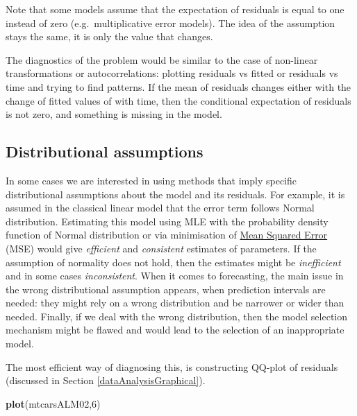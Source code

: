 \documentclass[
]{book}
\newenvironment{Shaded}{\begin{snugshade}}{\end{snugshade}}
\newcommand{\DecValTok}[1]{\textcolor[rgb]{0.00,0.00,0.81}{#1}}
\newcommand{\KeywordTok}[1]{\textcolor[rgb]{0.13,0.29,0.53}{\textbf{#1}}}
\newcommand{\NormalTok}[1]{#1}
\theoremstyle{definition}
\theoremstyle{definition}
\theoremstyle{definition}
\theoremstyle{definition}
\theoremstyle{remark}
\begin{document}
Note that some models assume that the expectation of residuals is equal to one instead of zero (e.g.~multiplicative error models). The idea of the assumption stays the same, it is only the value that changes.

The diagnostics of the problem would be similar to the case of non-linear transformations or autocorrelations: plotting residuals vs fitted or residuals vs time and trying to find patterns. If the mean of residuals changes either with the change of fitted values of with time, then the conditional expectation of residuals is not zero, and something is missing in the model.

\hypertarget{assumptionsDistribution}{%
\subsection{Distributional assumptions}\label{assumptionsDistribution}}

In some cases we are interested in using methods that imply specific distributional assumptions about the model and its residuals. For example, it is assumed in the classical linear model that the error term follows Normal distribution. Estimating this model using MLE with the probability density function of Normal distribution or via minimisation of \protect\hyperlink{errorMeasures}{Mean Squared Error} (MSE) would give \emph{efficient} and \emph{consistent} estimates of parameters. If the assumption of normality does not hold, then the estimates might be \emph{inefficient} and in some cases \emph{inconsistent}. When it comes to forecasting, the main issue in the wrong distributional assumption appears, when prediction intervals are needed: they might rely on a wrong distribution and be narrower or wider than needed. Finally, if we deal with the wrong distribution, then the model selection mechanism might be flawed and would lead to the selection of an inappropriate model.

The most efficient way of diagnosing this, is constructing QQ-plot of residuals (discussed in Section \ref{dataAnalysisGraphical}).

\begin{Shaded}
\begin{Highlighting}[]
\KeywordTok{plot}\NormalTok{(mtcarsALM02,}\DecValTok{6}\NormalTok{)}
\end{Highlighting}
\end{Shaded}
\end{document}
